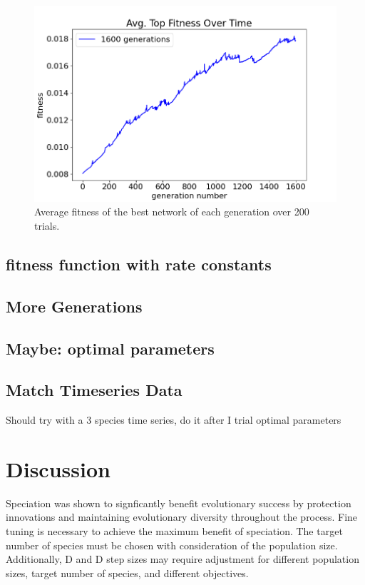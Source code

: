 \documentclass[12pt]{report}
\begin{document}
\begin{figure}
\centering
    \includegraphics[width=15cm]{images/1600_top_fitness.png}
    \caption[Average top fitness over 1600 generations]{Average fitness of the best network of each generation over 200 trials.}
    \label{fig:1600_top_fitness}
\end{figure}

\subsection{fitness function with rate constants}

\subsection{More Generations}

\subsection{Maybe: optimal parameters}

\subsection{Match Timeseries Data}
Should try with a 3 species time series, do it after I trial optimal parameters

\section{Discussion}
Speciation was shown to signficantly benefit evolutionary success by protection innovations and maintaining evolutionary diversity throughout the process. Fine tuning is necessary to achieve the maximum benefit of speciation. The target number of species must be chosen with consideration of the population size. Additionally, D and D step sizes may require adjustment for different population sizes, target number of species, and different objectives. 
\end{document}
